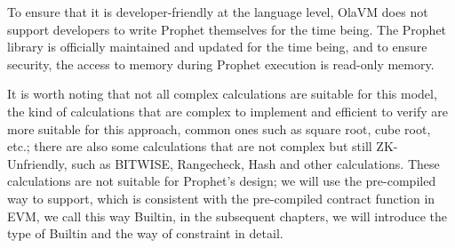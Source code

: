 To ensure that it is developer-friendly at the language level, OlaVM does not support developers to write Prophet themselves for
the time being. The Prophet library is officially maintained and updated for the time being, and to ensure security, the access to
memory during Prophet execution is read-only memory.

It is worth noting that not all complex calculations are suitable for this model, the kind of calculations that are complex to implement
and efficient to verify are more suitable for this approach, common ones such as square root, cube root, etc.; there are also some calculations
that are not complex but still ZK-Unfriendly, such as BITWISE, Rangecheck, Hash and other calculations. These calculations are not suitable
for Prophet's design; we will use the pre-compiled way to support, which is consistent with the pre-compiled contract function in EVM, we
call this way Builtin, in the subsequent chapters, we will introduce the type of Builtin and the way of constraint in detail.